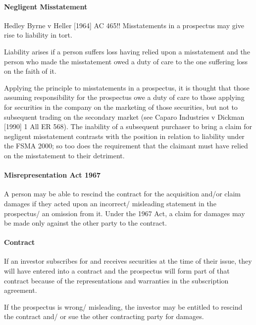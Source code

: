 \documentclass[
]{article}
\begin{document}
\hypertarget{negligent-misstatement}{%
\paragraph{Negligent Misstatement}\label{negligent-misstatement}}

Hedley Byrne v Heller {[}1964{]} AC 465!! Misstatements in a prospectus
may give rise to liability in tort.

Liability arises if a person suffers loss having relied upon a
misstatement and the person who made the misstatement owed a duty of
care to the one suffering loss on the faith of it.

Applying the principle to misstatements in a prospectus, it is thought
that those assuming responsibility for the prospectus owe a duty of care
to those applying for securities in the company on the marketing of
those securities, but not to subsequent trading on the secondary market
(see Caparo Industries v Dickman {[}1990{]} 1 All ER 568). The inability
of a subsequent purchaser to bring a claim for negligent misstatement
contrasts with the position in relation to liability under the FSMA
2000; so too does the requirement that the claimant must have relied on
the misstatement to their detriment.

\hypertarget{misrepresentation-act-1967}{%
\paragraph{Misrepresentation Act
1967}\label{misrepresentation-act-1967}}

A person may be able to rescind the contract for the acquisition and/or
claim damages if they acted upon an incorrect/ misleading statement in
the prospectus/ an omission from it. Under the 1967 Act, a claim for
damages may be made only against the other party to the contract.

\hypertarget{contract}{%
\paragraph{Contract}\label{contract}}

If an investor subscribes for and receives securities at the time of
their issue, they will have entered into a contract and the prospectus
will form part of that contract because of the representations and
warranties in the subscription agreement.

If the prospectus is wrong/ misleading, the investor may be entitled to
rescind the contract and/ or sue the other contracting party for
damages.
\end{document}
